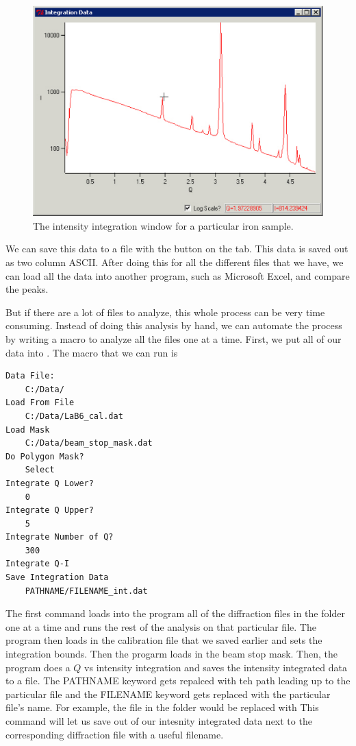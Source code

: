 \begin{figure}
    \centering
    \includegraphics[scale=.75]{figures/iron_intensity.eps}
    \caption{The intensity integration window for 
    a particular iron sample.}
    \label{iron_intensity}
\end{figure}

We can save this data to a file with the 
button on the  tab. This data is
saved out as two column ASCII.
After doing this for all the different files that
we have, we can load all the data into another program,
such as Microsoft Excel, and compare the peaks.

But if there are a lot of files to analyze, this whole
process can be very time consuming. Instead of doing 
this analysis by hand, we can automate the process by
writing a macro to analyze all the files one at a 
time. First, we put all of our data into .
The macro that we can run is
\begin{lstlisting}[caption={'A macro to automate the 
    analysis'}]
Data File:
	C:/Data/
Load From File
    C:/Data/LaB6_cal.dat
Load Mask
    C:/Data/beam_stop_mask.dat
Do Polygon Mask?
    Select
Integrate Q Lower?
	0
Integrate Q Upper?
	5
Integrate Number of Q?
	300
Integrate Q-I
Save Integration Data
    PATHNAME/FILENAME_int.dat
\end{lstlisting}
The first command loads into the program all of the
diffraction files in the folder 
one at a time and runs the rest of the analysis on
that particular file. The program then loads in
the calibration file that we saved earlier and sets the
integration bounds. Then the progarm loads in the
beam stop mask. Then, the program does a 
$Q$ vs intensity integration and saves the intensity
integrated data to a file. The PATHNAME keyword gets
repalced with teh path leading up to the particular 
file and the FILENAME keyword gets replaced with 
the particular file's name. For example, the file
 in
the folder  would
be replaced with
This command will let us save out of our intesnity
integrated data next to the corresponding diffraction
file with a useful filename.

